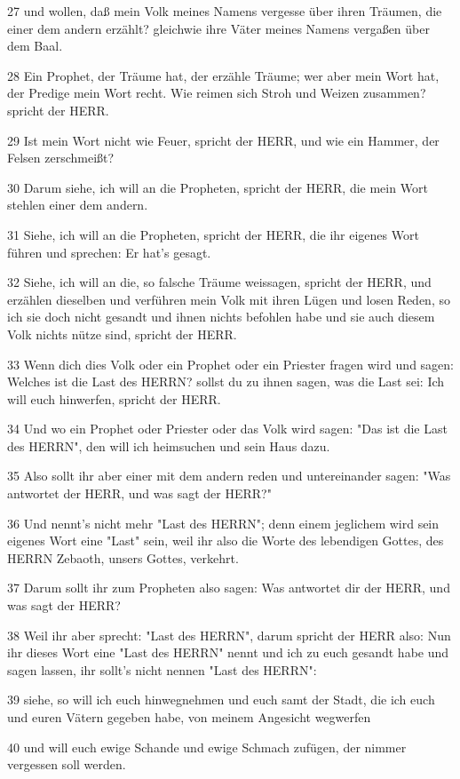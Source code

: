 \par 27 und wollen, daß mein Volk meines Namens vergesse über ihren Träumen, die einer dem andern erzählt? gleichwie ihre Väter meines Namens vergaßen über dem Baal.
\par 28 Ein Prophet, der Träume hat, der erzähle Träume; wer aber mein Wort hat, der Predige mein Wort recht. Wie reimen sich Stroh und Weizen zusammen? spricht der HERR.
\par 29 Ist mein Wort nicht wie Feuer, spricht der HERR, und wie ein Hammer, der Felsen zerschmeißt?
\par 30 Darum siehe, ich will an die Propheten, spricht der HERR, die mein Wort stehlen einer dem andern.
\par 31 Siehe, ich will an die Propheten, spricht der HERR, die ihr eigenes Wort führen und sprechen: Er hat's gesagt.
\par 32 Siehe, ich will an die, so falsche Träume weissagen, spricht der HERR, und erzählen dieselben und verführen mein Volk mit ihren Lügen und losen Reden, so ich sie doch nicht gesandt und ihnen nichts befohlen habe und sie auch diesem Volk nichts nütze sind, spricht der HERR.
\par 33 Wenn dich dies Volk oder ein Prophet oder ein Priester fragen wird und sagen: Welches ist die Last des HERRN? sollst du zu ihnen sagen, was die Last sei: Ich will euch hinwerfen, spricht der HERR.
\par 34 Und wo ein Prophet oder Priester oder das Volk wird sagen: "Das ist die Last des HERRN", den will ich heimsuchen und sein Haus dazu.
\par 35 Also sollt ihr aber einer mit dem andern reden und untereinander sagen: "Was antwortet der HERR, und was sagt der HERR?"
\par 36 Und nennt's nicht mehr "Last des HERRN"; denn einem jeglichem wird sein eigenes Wort eine "Last" sein, weil ihr also die Worte des lebendigen Gottes, des HERRN Zebaoth, unsers Gottes, verkehrt.
\par 37 Darum sollt ihr zum Propheten also sagen: Was antwortet dir der HERR, und was sagt der HERR?
\par 38 Weil ihr aber sprecht: "Last des HERRN", darum spricht der HERR also: Nun ihr dieses Wort eine "Last des HERRN" nennt und ich zu euch gesandt habe und sagen lassen, ihr sollt's nicht nennen "Last des HERRN":
\par 39 siehe, so will ich euch hinwegnehmen und euch samt der Stadt, die ich euch und euren Vätern gegeben habe, von meinem Angesicht wegwerfen
\par 40 und will euch ewige Schande und ewige Schmach zufügen, der nimmer vergessen soll werden.


